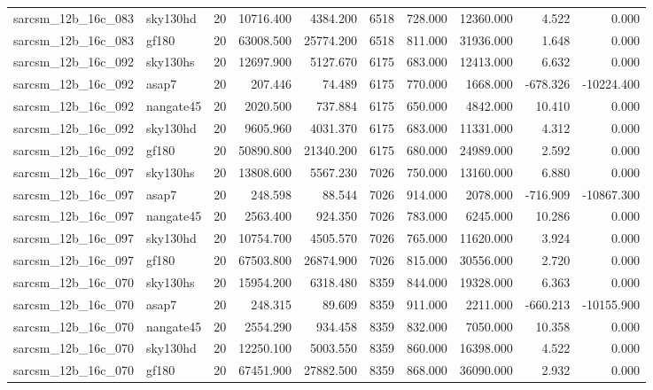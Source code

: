 \begin{tabular}{llrrrrrrrr}
sarcsm\_12b\_16c\_083 & sky130hd & 20 & 10716.400 & 4384.200 & 6518 & 728.000 & 12360.000 & 4.522 & 0.000 \\
sarcsm\_12b\_16c\_083 & gf180 & 20 & 63008.500 & 25774.200 & 6518 & 811.000 & 31936.000 & 1.648 & 0.000 \\
sarcsm\_12b\_16c\_092 & sky130hs & 20 & 12697.900 & 5127.670 & 6175 & 683.000 & 12413.000 & 6.632 & 0.000 \\
sarcsm\_12b\_16c\_092 & asap7 & 20 & 207.446 & 74.489 & 6175 & 770.000 & 1668.000 & -678.326 & -10224.400 \\
sarcsm\_12b\_16c\_092 & nangate45 & 20 & 2020.500 & 737.884 & 6175 & 650.000 & 4842.000 & 10.410 & 0.000 \\
sarcsm\_12b\_16c\_092 & sky130hd & 20 & 9605.960 & 4031.370 & 6175 & 683.000 & 11331.000 & 4.312 & 0.000 \\
sarcsm\_12b\_16c\_092 & gf180 & 20 & 50890.800 & 21340.200 & 6175 & 680.000 & 24989.000 & 2.592 & 0.000 \\
sarcsm\_12b\_16c\_097 & sky130hs & 20 & 13808.600 & 5567.230 & 7026 & 750.000 & 13160.000 & 6.880 & 0.000 \\
sarcsm\_12b\_16c\_097 & asap7 & 20 & 248.598 & 88.544 & 7026 & 914.000 & 2078.000 & -716.909 & -10867.300 \\
sarcsm\_12b\_16c\_097 & nangate45 & 20 & 2563.400 & 924.350 & 7026 & 783.000 & 6245.000 & 10.286 & 0.000 \\
sarcsm\_12b\_16c\_097 & sky130hd & 20 & 10754.700 & 4505.570 & 7026 & 765.000 & 11620.000 & 3.924 & 0.000 \\
sarcsm\_12b\_16c\_097 & gf180 & 20 & 67503.800 & 26874.900 & 7026 & 815.000 & 30556.000 & 2.720 & 0.000 \\
sarcsm\_12b\_16c\_070 & sky130hs & 20 & 15954.200 & 6318.480 & 8359 & 844.000 & 19328.000 & 6.363 & 0.000 \\
sarcsm\_12b\_16c\_070 & asap7 & 20 & 248.315 & 89.609 & 8359 & 911.000 & 2211.000 & -660.213 & -10155.900 \\
sarcsm\_12b\_16c\_070 & nangate45 & 20 & 2554.290 & 934.458 & 8359 & 832.000 & 7050.000 & 10.358 & 0.000 \\
sarcsm\_12b\_16c\_070 & sky130hd & 20 & 12250.100 & 5003.550 & 8359 & 860.000 & 16398.000 & 4.522 & 0.000 \\
sarcsm\_12b\_16c\_070 & gf180 & 20 & 67451.900 & 27882.500 & 8359 & 868.000 & 36090.000 & 2.932 & 0.000 \\
\bottomrule
\end{tabular}
